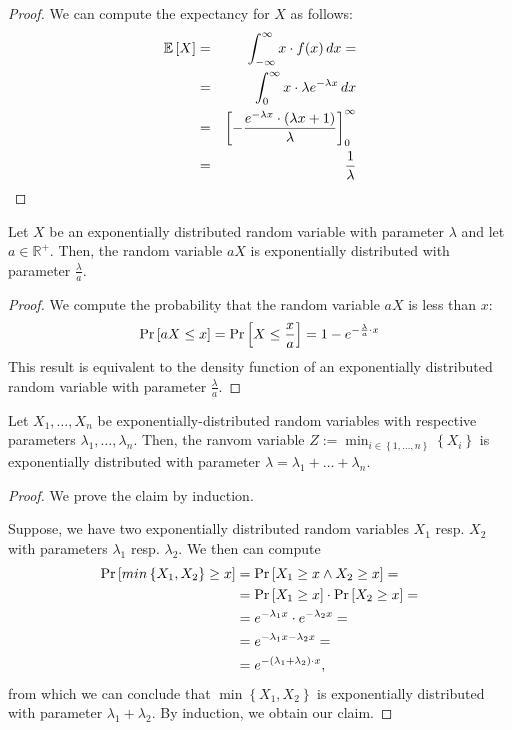 \begin{proof}
  We can compute the expectancy for $X$ as follows:
  \begin{eqnarray*}
    \mathbb{E}\left[ X \right] 
    &=& \int_{-\infty}^\infty x\cdot f(x)\, dx = \\
    &=& \int_{0}^\infty x\cdot \lambda e^{-\lambda x}\, dx \\
    &=& \left[ - \frac{e^{-\lambda x}\cdot \left( \lambda x + 1 \right)}{\lambda} \right]_{0}^\infty \\
    &=& \frac{1}{\lambda}
  \end{eqnarray*}
\end{proof}

\begin{theorem}[Scalability]
  \label{thm:expoenential-distr-scalability}
  Let $X$ be an exponentially distributed random variable with parameter $\lambda$ and let $a\in \mathbb{R}^+$. Then, the random variable $aX$ is exponentially distributed with parameter $\frac{\lambda}{a}$.
\end{theorem}

\begin{proof}
  We compute the probability that the random variable $aX$ is less than $x$:
  \begin{equation*}
    \operatorname{Pr}\left[aX \leq x\right] 
    = \operatorname{Pr}\left[X \leq \frac{x}{a}\right]
    = 1 - e^{-\frac{\lambda}{a} \cdot x}
  \end{equation*}
  This result is equivalent to the density function of an exponentially distributed random variable with parameter $\frac{\lambda}{a}$.
\end{proof}

\begin{theorem}
  \label{thm:minimum-of-exponential-distribution-is-exponential}
  Let $X_1,\dots,X_n$ be exponentially-distributed random variables with respective parameters $\lambda_1,\dots,\lambda_n$. Then, the ranvom variable $Z:=\min_{i\in\left\{ 1,\dots,n \right\}} \left\{ X_i \right\}$ is exponentially distributed with parameter $\lambda=\lambda_1+\dots+\lambda_n$.
\end{theorem}

\begin{proof}
  We prove the claim by induction. 

  Suppose, we have two exponentially distributed random variables $X_1$ resp. $X_2$ with parameters $\lambda_1$ resp. $\lambda_2$. We then can compute
  \begin{align*}
    \operatorname{Pr}\left[min\left\{ X_1,X_2 \right\} \geq x\right] & = \operatorname{Pr}\left[X_1 \geq x \wedge X_2 \geq x\right] = \\ 
    & = \operatorname{Pr}\left[X_1 \geq x\right]\cdot\operatorname{Pr}\left[X_2 \geq x\right] = \\
    & = e^{-\lambda_1 x} \cdot e^{-\lambda_2 x} = \\
    & = e^{-\lambda_1 x - \lambda_2 x} = \\
    & = e^{-\left( \lambda_1+\lambda_2 \right) \cdot x},
  \end{align*}
  from which we can conclude that $\min\left\{ X_1,X_2 \right\}$ is exponentially distributed with parameter $\lambda_1 + \lambda_2$. By induction, we obtain our claim.
\end{proof}

